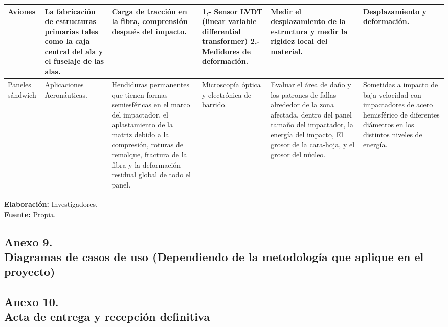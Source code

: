 \documentclass[12pt, a4paper, nofontenc, numbers=endperiod]{apa7}
\begin{document}
{\begin{center}
{{\begin{tabular}{|p{2cm}|p{2cm}|p{2.5cm}|p{2cm}|p{2cm}|p{2.5cm}|}
				Aviones
				& La fabricación de estructuras primarias tales como la caja central del ala y el fuselaje de las alas. 
				& Carga de tracción en la fibra, comprensión después del impacto.
				&1,- Sensor LVDT (linear variable differential transformer) 2,- Medidores de deformación.
				&Medir el desplazamiento de la estructura y medir la rigidez local del material.
				&Desplazamiento y deformación.
				\\
				\hline
				Paneles sándwich
				&Aplicaciones Aeronáuticas.
				&Hendiduras permanentes que tienen formas semiesféricas en el marco del impactador, el aplastamiento de la matriz debido a la compresión, roturas de remolque, fractura de la fibra y la deformación residual global de todo el panel. 
				&Microscopía óptica y electrónica de barrido.
				& Evaluar el área de daño y los patrones de fallas alrededor de la zona afectada, dentro del panel tamaño del impactador, la energía del impacto, El grosor de la cara-hoja, y el grosor del núcleo.
				&Sometidas a impacto de baja velocidad con impactadores de acero hemisférico de diferentes diámetros en los distintos niveles de energía.
				\\
				\hline
				
			\end{tabular}
		}
	}
\end{center}	

\vspace*{-1cm}
\begin{center}
	\singlespacing\textbf{Elaboración:} Investigadores.\\
	\textbf{Fuente:} Propia.
\end{center}

\newpage
\subsection*{\normalsize \centering Anexo 9. \\ Diagramas de casos de uso (Dependiendo de la metodología que aplique en el proyecto)}
\newpage
\subsection*{\normalsize \centering Anexo 10. \\ Acta de entrega y recepción definitiva }
\vspace*{0.5cm}

}
\end{document}
